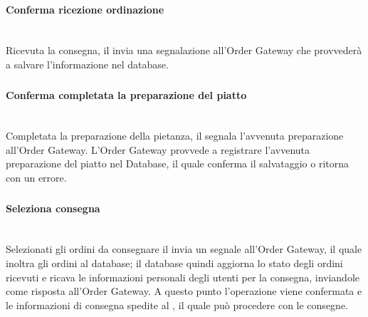 \paragraph{Conferma ricezione ordinazione}\mbox{}\\
Ricevuta la consegna, il \Customer{} invia una segnalazione all’Order Gateway che provvederà a salvare l'informazione nel database.

\subsubsection{\Chef{}}

\paragraph{Conferma completata la preparazione del piatto}\mbox{}\\
Completata la preparazione della pietanza, il \Chef{} segnala l’avvenuta preparazione all’Order Gateway. L’Order Gateway provvede a registrare l’avvenuta preparazione del piatto nel Database, il quale conferma il salvataggio o ritorna con un errore.

\subsubsection{\Deliveryman{}}

\paragraph{Seleziona consegna}\mbox{}\\
Selezionati gli ordini da consegnare il \Deliveryman{} invia un segnale all’Order Gateway, il quale inoltra gli ordini al database; il database quindi aggiorna lo stato degli ordini ricevuti e ricava le informazioni personali degli utenti per la consegna, inviandole come risposta all’Order Gateway. A questo punto l’operazione viene confermata e le informazioni di consegna spedite al \Deliveryman{}, il quale può procedere con le consegne.

